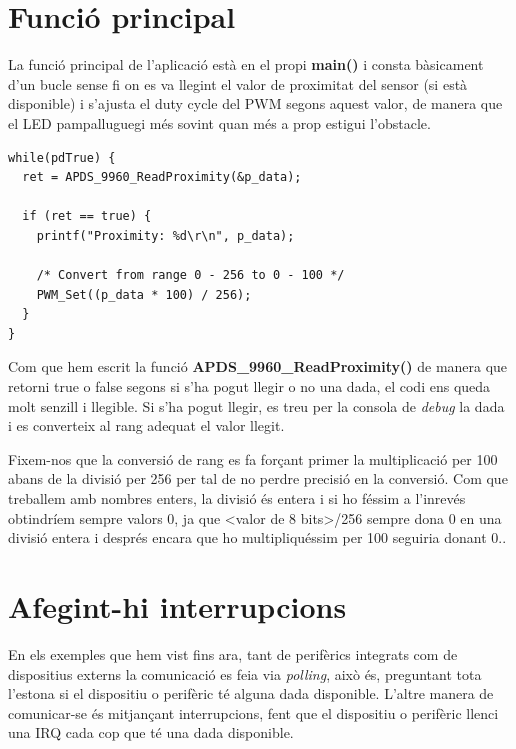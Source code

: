 \section{Funció principal}
La funció principal de l'aplicació està en el propi {\bf main()} i consta bàsicament d'un bucle sense fi on es va llegint el valor de proximitat del sensor (si està disponible) i s'ajusta el \gls{duty cycle} del \gls{PWM} segons aquest valor, de manera que el LED pampalluguegi més sovint quan més a prop estigui l'obstacle.

\begin{lstlisting}[caption={Funció principal},style=customc,label=ProximityExample]
while(pdTrue) {
  ret = APDS_9960_ReadProximity(&p_data);

  if (ret == true) {
    printf("Proximity: %d\r\n", p_data);

    /* Convert from range 0 - 256 to 0 - 100 */
    PWM_Set((p_data * 100) / 256);
  }
}
\end{lstlisting}

Com que hem escrit la funció {\bf APDS\_9960\_ReadProximity()} de manera que retorni true o false segons si s'ha pogut llegir o no una dada, el codi ens queda molt senzill i llegible. Si s'ha pogut llegir, es treu per la consola de {\em debug} la dada i es converteix al rang adequat el valor llegit.

\begin{remark}
 Fixem-nos que la conversió de rang es fa forçant primer la multiplicació per 100 abans de la divisió per 256 per tal de no perdre precisió en la conversió. Com que treballem amb nombres enters, la divisió és entera i si ho féssim a l'inrevés obtindríem sempre valors 0, ja que <valor de 8 bits>/256 sempre dona 0 en una divisió entera i després encara que ho multipliquéssim per 100 seguiria donant 0..
\end{remark}


\section{Afegint-hi interrupcions}
\label{sec:full_app_irq}
En els exemples que hem vist fins ara, tant de perifèrics integrats com de dispositius externs la comunicació es feia via {\em polling}, això és, preguntant tota l'estona si el dispositiu o perifèric té alguna dada disponible. L'altre manera de comunicar-se és mitjançant interrupcions, fent que el dispositiu o perifèric llenci una \gls{IRQ} cada cop que té una dada disponible.

